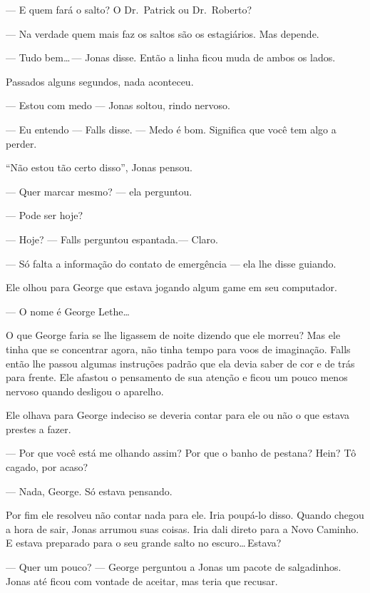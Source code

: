 --- E quem fará o salto? O Dr.~Patrick ou Dr.~Roberto?

--- Na verdade\mudanca{,} quem mais faz os saltos são os estagiários. Mas depende.

--- Tudo bem\ldots\,--- Jonas disse. Então a linha ficou muda de ambos os lados.

Passados alguns segundos, nada aconteceu.

--- Estou com medo --- Jonas soltou, rindo nervoso.

--- Eu entendo --- Falls disse. --- Medo é bom. Significa que você tem algo a perder.

``Não estou tão certo disso'', Jonas pensou.

--- Quer marcar mesmo? --- ela perguntou.

--- Pode ser hoje?

--- Hoje? --- Falls perguntou espantada.--- Claro.


--- Só falta a informação do contato de emergência --- ela lhe disse\mudanca{,} guiando.

Ele olhou para George que estava jogando algum game em seu computador.

--- O nome é George Lethe\ldots

O que George faria se lhe ligassem de noite dizendo que ele morreu? Mas ele tinha que se concentrar agora, não tinha tempo para voos de imaginação. Falls então lhe passou algumas instruções padrão que ela devia saber de cor e de trás para frente. Ele afastou o pensamento de sua atenção e ficou um pouco menos nervoso quando desligou o aparelho.

Ele olhava para George\mudanca{,} indeciso se deveria contar para ele ou não o que estava prestes a fazer.

--- Por que você está me olhando assim? Por que o banho de pestana? Hein? Tô cagado, por acaso?

--- Nada, George. Só estava pensando.

Por fim ele resolveu não contar nada para ele. Iria poupá-lo disso. Quando chegou a hora de sair, Jonas arrumou suas coisas. Iria dali direto para a Novo Caminho. E estava preparado para o seu grande salto no escuro\ldots\,Estava?

--- Quer um pouco? --- George perguntou a Jonas  um pacote de salgadinhos. Jonas até ficou com vontade de aceitar, mas teria que recusar.

